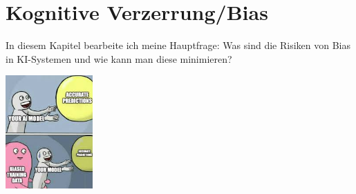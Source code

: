 \chapter{Kognitive Verzerrung/Bias}
In diesem Kapitel bearbeite ich meine Hauptfrage: 
Was sind die Risiken von Bias in KI-Systemen und wie kann man diese minimieren?
      
     
\includegraphics[width=0.25\textwidth]{images.jpg}